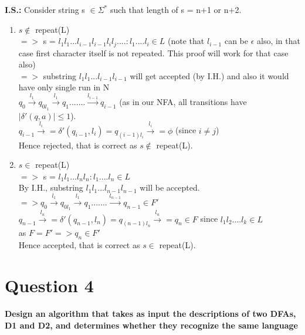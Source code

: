 \documentclass{article}
\begin{document}
\textbf{I.S.:} Consider string s $\in \Sigma^*$ such that length of s = n+1 or n+2.
    \begin{enumerate}
        \item  $s \notin $ repeat(L)\\
        $=> $ s = $l_1l_1...l_{i-1}l_{i-1}l_il_j.... : l_1....l_i \in L$ (note that $l_{i-1}$ can be $\epsilon$ also, in that case first character itself is not repeated. This proof will work for that 
        case also)\\
        $=> $ substring $l_1l_1...l_{i-1}l_{i-1} $ will get accepted (by I.H.) and also it would have only single run in N\\
        $q_0 \xrightarrow{l_1} q_{0l_1} \xrightarrow{l_1} q_1 ....... \xrightarrow{l_{i-1}} q_{i-1}$ (as in our NFA, all transitions have $|\delta'(q,a)| \leq 1$).\\
        $q_{i-1} \xrightarrow{l_i} = \delta'(q_{i-1},l_i) = q_{(i-1)l_i} \xrightarrow{l_i} = \phi$ (since $i \neq j$)\\
        Hence rejected, that is correct as $s \notin $ repeat(L).

        \item  $s \in $ repeat(L)\\
        $=> $ s = $l_1l_1...l_nl_n : l_1....l_n \in L$\\
        By I.H., substring $l_1l_1...l_{n-1}l_{n-1}$ will be accepted.\\
        $=> q_0 \xrightarrow{l_1} q_{0l_1} \xrightarrow{l_1} q_1 ....... \xrightarrow{l_{n-1}} q_{n-1} \in F'$ 
        $q_{n-1} \xrightarrow{l_n} = \delta'(q_{n-1},l_n) = q_{(n-1)l_n} \xrightarrow{l_n} = q_n \in F $ since $l_1l_2....l_k \in L$\\
        as $F = F' => q_n \in F'$\\
        Hence accepted, that is correct as $s \in $ repeat(L).
    \end{enumerate}





\pagebreak
\section{Question 4}
\textbf{Design an algorithm that takes as input the descriptions of two DFAs, D1 and D2, and
determines whether they recognize the same language}\\
\end{document}
